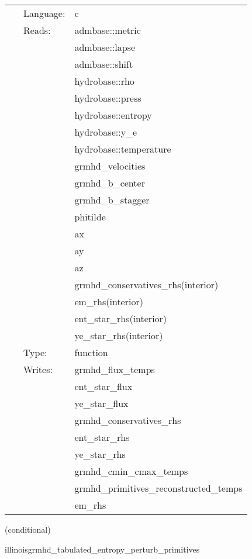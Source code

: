  \begin{tabular*}{160mm}{cll} 
~ & Language:  & c \\ 
~ & Reads:  & admbase::metric \\ 
~& ~ &admbase::lapse\\ 
~& ~ &admbase::shift\\ 
~& ~ &hydrobase::rho\\ 
~& ~ &hydrobase::press\\ 
~& ~ &hydrobase::entropy\\ 
~& ~ &hydrobase::y\_e\\ 
~& ~ &hydrobase::temperature\\ 
~& ~ &grmhd\_velocities\\ 
~& ~ &grmhd\_b\_center\\ 
~& ~ &grmhd\_b\_stagger\\ 
~& ~ &phitilde\\ 
~& ~ &ax\\ 
~& ~ &ay\\ 
~& ~ &az\\ 
~& ~ &grmhd\_conservatives\_rhs(interior)\\ 
~& ~ &em\_rhs(interior)\\ 
~& ~ &ent\_star\_rhs(interior)\\ 
~& ~ &ye\_star\_rhs(interior)\\ 
~ & Type:  & function \\ 
~ & Writes:  & grmhd\_flux\_temps \\ 
~& ~ &ent\_star\_flux\\ 
~& ~ &ye\_star\_flux\\ 
~& ~ &grmhd\_conservatives\_rhs\\ 
~& ~ &ent\_star\_rhs\\ 
~& ~ &ye\_star\_rhs\\ 
~& ~ &grmhd\_cmin\_cmax\_temps\\ 
~& ~ &grmhd\_primitives\_reconstructed\_temps\\ 
~& ~ &em\_rhs\\ 
\end{tabular*} 


\vspace{5mm}

   (conditional) 

\hspace{5mm} illinoisgrmhd\_tabulated\_entropy\_perturb\_primitives 

\hspace{5mm}{\it entropy+tabulated version of illinoisgrmhd\_perturb\_primitives } 


